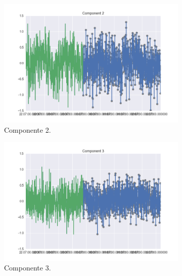 \documentclass[11pt,spanish,listoffigures,listoftables]{tfgetsinf}
\begin{document}
        \begin{figure}[H]
            \begin{subfigure}[h]{0.49\textwidth}
                \centering
                \includegraphics[width=\textwidth]{c2_simulation_arima_gaussian.png}
                \caption{Componente 2.}
                \label{fig:c2_simulation_arima_gaussian}
            \end{subfigure}
            \begin{subfigure}[h]{0.49\textwidth}
                \centering
                \includegraphics[width=\textwidth]{c3_simulation_arima_gaussian.png}
                \caption{Componente 3.}
                \label{fig:c3_simulation_arima_gaussian}
            \end{subfigure}
            \begin{subfigure}[h]{0.49\textwidth}
                \centering

\end{subfigure}
\end{figure}
\end{document}
